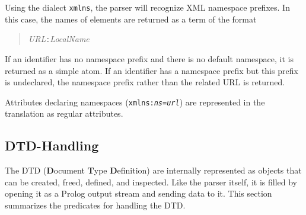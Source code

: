 Using the dialect {\tt xmlns}, the parser will recognize XML 
namespace prefixes. In this case, the names of elements are returned as a term 
of the format

\begin{quote}
  {\it URL}{\tt :}{\it LocalName} 
\end{quote}

If an identifier has no namespace prefix and there is no default namespace, it 
is returned as a simple atom. If an identifier has a namespace prefix but this 
prefix is undeclared, the namespace prefix rather than the related URL 
is returned.

Attributes declaring namespaces ({\tt xmlns:{\it ns}={\it url}})
are represented in the translation as regular attributes.


\subsection{DTD-Handling}

The DTD ({\bf D}ocument {\bf T}ype {\bf D}efinition) are internally
represented as objects
that can be created, freed, defined, and inspected. 
Like the parser itself, it is filled by opening it as a Prolog output
stream and sending data to it. This section summarizes the predicates 
for handling the DTD.


